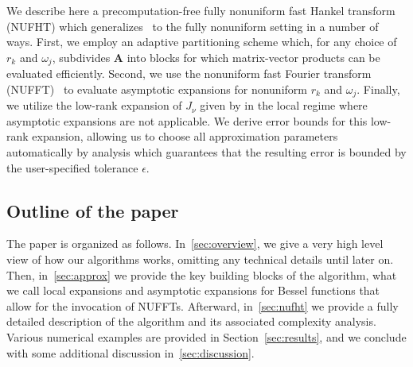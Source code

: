 We describe here a precomputation-free fully nonuniform fast Hankel transform
(NUFHT) which generalizes~\cite{townsend2015fast} to the fully nonuniform
setting in a number of ways. First, we employ an adaptive partitioning scheme
which, for any choice of $r_k$ and $\omega_j$, subdivides $\bm{A}$ into blocks
for which matrix-vector products can be evaluated efficiently. Second, we use
the nonuniform fast Fourier transform (NUFFT)~\cite{dutt1993fast,
greengard2004accelerating} to evaluate asymptotic expansions for nonuniform
$r_k$ and $\omega_j$. Finally, we utilize the low-rank expansion of $J_\nu$
given by \cite{wimp1962polynomial} in the local regime where asymptotic
expansions are not applicable. We derive error bounds for this low-rank
expansion, allowing us to choose all approximation parameters automatically by
analysis which guarantees that the resulting error is bounded by the
user-specified tolerance $\epsilon$.



\subsection*{Outline of the paper}

The paper is organized as follows. In~\ref{sec:overview}, we give a very high
level view of how our algorithms works, omitting any technical details until
later on. Then, in~\ref{sec:approx} we provide the key building blocks of the
algorithm, what we call local expansions and asymptotic expansions for Bessel
functions that allow for the invocation of NUFFTs. Afterward, in~\ref{sec:nufht}
we provide a fully detailed description of the algorithm and its associated
complexity analysis. Various numerical examples are provided in
Section~\ref{sec:results}, and we conclude with some additional discussion
in~\ref{sec:discussion}.


